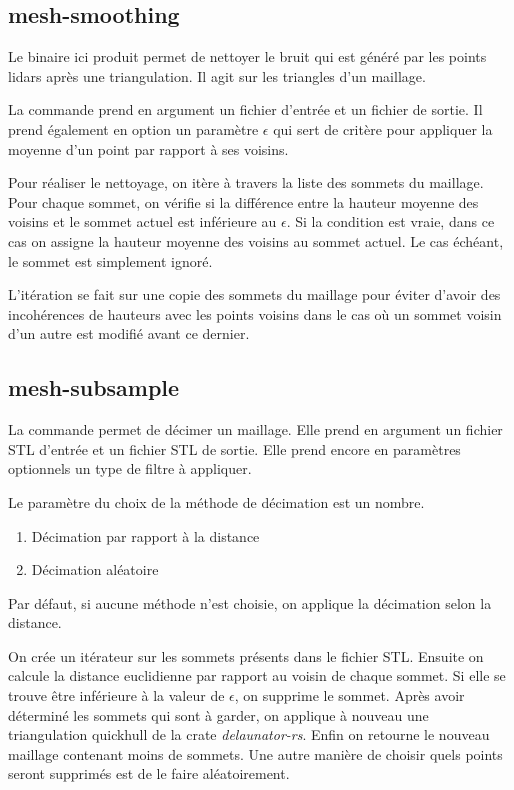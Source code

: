 \subsection{mesh-smoothing}

Le binaire ici produit permet de nettoyer le bruit qui est généré par les points
lidars après une triangulation. Il agit sur les triangles d'un maillage.

La commande prend en argument un fichier d'entrée et un fichier de sortie. Il
prend également en option un paramètre $\epsilon$ qui sert de critère pour
appliquer la moyenne d'un point par rapport à ses voisins.

Pour réaliser le nettoyage, on itère à travers la liste des sommets du maillage.
Pour chaque sommet, on vérifie si la différence entre la hauteur moyenne des voisins
et le sommet actuel est inférieure au $\epsilon$.
Si la condition est vraie, dans ce cas on assigne la hauteur moyenne des voisins
au sommet actuel. Le cas échéant, le sommet est simplement ignoré.

L'itération se fait sur une copie des sommets du maillage pour éviter d'avoir
des incohérences de hauteurs avec les points voisins dans le cas où un sommet
voisin d'un autre est modifié avant ce dernier.

\subsection{mesh-subsample}

La commande permet de décimer un maillage. Elle
prend en argument un fichier STL d'entrée et un fichier STL de sortie.
Elle prend encore en paramètres optionnels un type de filtre à appliquer.

Le paramètre du choix de la méthode de décimation est un nombre.

\begin{enumerate}
	\item Décimation par rapport à la distance
	\item Décimation aléatoire
\end{enumerate}

Par défaut, si aucune méthode n'est choisie, on applique la décimation selon la
distance.

On crée un itérateur sur les sommets présents dans le fichier STL. Ensuite on
calcule la distance euclidienne par rapport au voisin de chaque sommet.
Si elle se trouve être inférieure à la valeur de $\epsilon$, on supprime le
sommet. Après avoir déterminé les sommets qui sont à garder, on applique à
nouveau une triangulation quickhull de la crate \textit{delaunator-rs}. Enfin on
retourne le nouveau maillage contenant moins de sommets. 
Une autre manière de
choisir quels points seront supprimés est de le faire aléatoirement.

